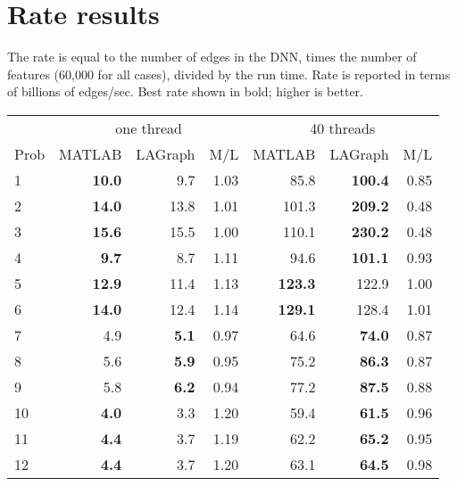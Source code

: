 \documentclass[12pt]{article}
\begin{document}
\newpage
\section{Rate results}

The rate is equal to the number of edges in the DNN, times the number of
features (60,000 for all cases), divided by the run time.  Rate is reported
in terms of billions of edges/sec.  Best rate shown in bold; higher is better.

\vspace{0.1in}
\begin{tabular}{l|rr|r||rr|r}
\hline
     & \multicolumn{3}{c}{one thread}               &  \multicolumn{3}{c}{40 threads}  \\
Prob & MATLAB & LAGraph & M/L                       &   MATLAB & LAGraph & M/L         \\
\hline
  1 &{\bf     10.0 }&           9.7  &     1.03  &  {        85.8 }& {\bf    100.4 }&     0.85   \\
  2 &{\bf     14.0 }&          13.8  &     1.01  &  {       101.3 }& {\bf    209.2 }&     0.48   \\
  3 &{\bf     15.6 }&          15.5  &     1.00  &  {       110.1 }& {\bf    230.2 }&     0.48   \\
\hline
  4 &{\bf      9.7 }&           8.7  &     1.11  &  {        94.6 }& {\bf    101.1 }&     0.93   \\
  5 &{\bf     12.9 }&          11.4  &     1.13  &  {\bf    123.3 }& {       122.9 }&     1.00   \\
  6 &{\bf     14.0 }&          12.4  &     1.14  &  {\bf    129.1 }& {       128.4 }&     1.01   \\
\hline
  7 &          4.9  & {\bf      5.1 }&     0.97  &  {        64.6 }& {\bf     74.0 }&     0.87   \\
  8 &          5.6  & {\bf      5.9 }&     0.95  &  {        75.2 }& {\bf     86.3 }&     0.87   \\
  9 &          5.8  & {\bf      6.2 }&     0.94  &  {        77.2 }& {\bf     87.5 }&     0.88   \\
\hline
 10 &{\bf      4.0 }&           3.3  &     1.20  &  {        59.4 }& {\bf     61.5 }&     0.96   \\
 11 &{\bf      4.4 }&           3.7  &     1.19  &  {        62.2 }& {\bf     65.2 }&     0.95   \\
 12 &{\bf      4.4 }&           3.7  &     1.20  &  {        63.1 }& {\bf     64.5 }&     0.98   \\
\end{tabular}
\end{document}
